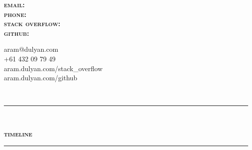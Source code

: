 \documentclass[a4paper,12pt]{article}
\begin{document}
%
\begin{spacing}{0.95}%
\pagestyle{empty}%
\begin{minipage}[t]{50mm}%
\end{minipage}%
\begin{minipage}[t]{45mm}%
	\vspace{-3.5mm}\begin{spacing}{0.8}\begin{flushright}{\small\textbf{\textsc{%
		email:\\
		phone:\\
		stack overflow:\\
		github:%
	}}}\end{flushright}\end{spacing}%
\end{minipage}%
\hspace{5mm}%
\begin{minipage}[t]{60mm}%
	\vspace{-4.5mm}\begin{spacing}{0.765}{\small%
		aram@dulyan.com\\
		+61 432 09 79 49\\
		aram.dulyan.com/stack\_overflow\\
		aram.dulyan.com/github%
	}\end{spacing}%
\end{minipage}\\
\vspace{-4.5mm}

\rule[1mm]{\linewidth}{2mm}\\
\begin{minipage}[t]{95.5mm}
	{\Large\textsc{\textbf{timeline}}}\\
	\rule[1mm]{\linewidth}{1mm}
	

\end{minipage}
\end{spacing}
\end{document}

